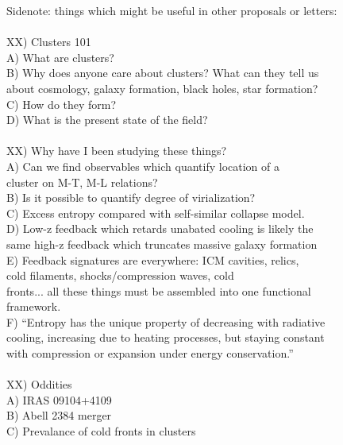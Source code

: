 \documentclass[12pt]{article}
\begin{document}
\begin{tabbing}
Sidenote: things which might be useful in other proposals or letters:\\
\\
XX) Clusters 101\\
\>	A) What are clusters?\\
\>	B) Why does anyone care about clusters? What can they tell us\\
\>\>	   about cosmology, galaxy formation, black holes, star formation?\\
\>	C) How do they form?\\
\>	D) What is the present state of the field?\\
\\
XX) Why have I been studying these things?\\
\>	A) Can we find observables which quantify location of a\\
\>\>	   cluster on M-T, M-L relations?\\
\>	B) Is it possible to quantify degree of virialization?\\
\>	C) Excess entropy compared with self-similar collapse model.\\
\>	D) Low-z feedback which retards unabated cooling is likely the\\
\>\>	   same high-z feedback which truncates massive galaxy formation\\
\>	E) Feedback signatures are everywhere: ICM cavities, relics,\\
\>\>	   cold filaments, shocks/compression waves,  cold\\
\>\>	   fronts... all these things must be assembled into one functional\\
\>\>	   framework.\\
\>	F) ``Entropy has the unique property of decreasing with radiative\\
\>\>	   cooling, increasing due to heating processes, but staying constant\\
\>\>	   with compression or expansion under energy conservation.''\\
\\
XX) Oddities\\
\>	A) IRAS 09104+4109\\
\>	B) Abell 2384 merger\\
\>	C) Prevalance of cold fronts in clusters\\

\end{tabbing}


 
\end{document}
